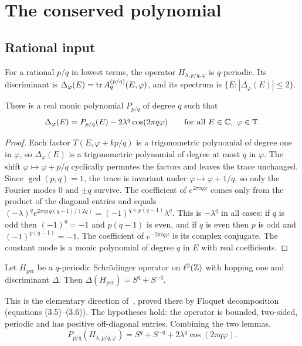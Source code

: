 \section{The conserved polynomial}\label{sec:poly}

\subsection{Rational input}

For a rational $p/q$ in lowest terms, the operator $H_{\lambda,p/q,\varphi}$ is $q$-periodic. Its discriminant is $\Delta_\varphi(E)=\operatorname{tr} A^{(p/q)}_q(E,\varphi)$, and its spectrum is $\{E:|\Delta_\varphi(E)|\le2\}$.

\begin{lemma}\label{lem:chambers}
There is a real monic polynomial $P_{p/q}$ of degree $q$ such that
\[
\Delta_\varphi(E)=P_{p/q}(E)-2\lambda^q\cos(2\pi q\varphi)\qquad\text{for all }E\in\mathbb C,\ \varphi\in\mathbb T.
\]
\end{lemma}

\begin{proof}
Each factor $T(E,\varphi+kp/q)$ is a trigonometric polynomial of degree one in $\varphi$, so $\Delta_\varphi(E)$ is a trigonometric polynomial of degree at most $q$ in $\varphi$. The shift $\varphi\mapsto\varphi+p/q$ cyclically permutes the factors and leaves the trace unchanged. Since $\gcd(p,q)=1$, the trace is invariant under $\varphi\mapsto\varphi+1/q$, so only the Fourier modes $0$ and $\pm q$ survive. The coefficient of $e^{2\pi iq\varphi}$ comes only from the product of the diagonal entries and equals $(-\lambda)^q e^{2\pi i p\,q(q-1)/(2q)}=(-1)^{q+p(q-1)}\lambda^q$. This is $-\lambda^q$ in all cases: if $q$ is odd then $(-1)^{q}=-1$ and $p(q-1)$ is even, and if $q$ is even then $p$ is odd and $(-1)^{p(q-1)}=-1$. The coefficient of $e^{-2\pi iq\varphi}$ is its complex conjugate. The constant mode is a monic polynomial of degree $q$ in $E$ with real coefficients.
\end{proof}

\begin{lemma}\label{lem:magic}
Let $H_{\mathrm{per}}$ be a $q$-periodic Schr\"odinger operator on $\ell^2(\mathbb Z)$ with hopping one and discriminant $\Delta$. Then $\Delta(H_{\mathrm{per}})=S^q+S^{-q}$.
\end{lemma}

This is the elementary direction of~\cite[Theorem~3.1]{DKS2010}, proved there by Floquet decomposition (equations (3.5)--(3.6)). The hypotheses hold: the operator is bounded, two-sided, periodic and has positive off-diagonal entries. Combining the two lemmas,
\begin{equation}\label{eq:ratmagic}
P_{p/q}(H_{\lambda,p/q,\varphi})=S^q+S^{-q}+2\lambda^q\cos(2\pi q\varphi).
\end{equation}

